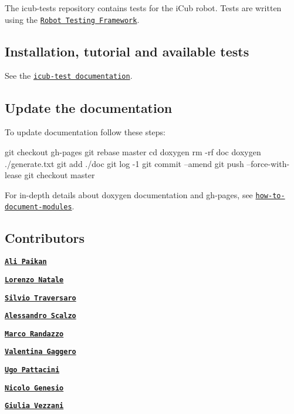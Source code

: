 The {\ttfamily icub-\/tests} repository contains tests for the i\+Cub robot. Tests are written using the \href{https://github.com/robotology/robot-testing-framework}{\tt Robot Testing Framework}.

\subsection*{Installation, tutorial and available tests}

See the \href{https://robotology.github.io/icub-tests/}{\tt icub-\/test documentation}.

\subsection*{Update the documentation}

To update documentation follow these steps\+:


\begin{DoxyCode}
git checkout gh-pages
git rebase master
cd doxygen
rm -rf doc
doxygen ./generate.txt
git add ./doc
git log -1
git commit --amend
git push --force-with-lease
git checkout master
\end{DoxyCode}
 For in-\/depth details about doxygen documentation and gh-\/pages, see \href{https://github.com/robotology/how-to-document-modules}{\tt how-\/to-\/document-\/modules}.

\subsection*{Contributors}


\begin{DoxyItemize}
\item \href{https://github.com/apaikan}{\tt {\bfseries Ali Paikan}}
\item \href{https://github.com/lornat75}{\tt {\bfseries Lorenzo Natale}}
\item \href{https://github.com/traversaro}{\tt {\bfseries Silvio Traversaro}}
\item \href{https://github.com/ale-git}{\tt {\bfseries Alessandro Scalzo}}
\item \href{https://github.com/randaz81}{\tt {\bfseries Marco Randazzo}}
\item \href{https://github.com/valegagge}{\tt {\bfseries Valentina Gaggero}}
\item \href{https://github.com/pattacini}{\tt {\bfseries Ugo Pattacini}}
\item \href{https://github.com/Nicogene}{\tt {\bfseries Nicolo\textquotesingle{} Genesio}}
\item \href{https://github.com/giuliavezzani}{\tt {\bfseries Giulia Vezzani}} 
\end{DoxyItemize}